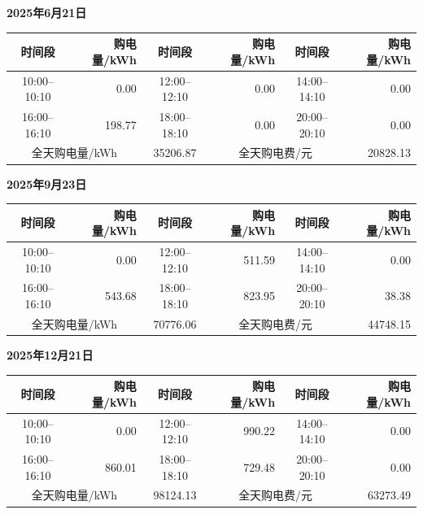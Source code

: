 \documentclass[UTF8,a4paper,12pt]{ctexart}
\begin{document}
\par\smallskip
\noindent\begin{minipage}{\textwidth}
  \centering\small
  \setlength{\tabcolsep}{4pt}
  \renewcommand{\arraystretch}{0.94}
  \textbf{2025年6月21日}\\[2pt]
  \begin{tabular}{|c|r|c|r|c|r|}
    \hline
    时间段 & 购电量/kWh & 时间段 & 购电量/kWh & 时间段 & 购电量/kWh\\
    \hline
    10:00--10:10 & 0.00 & 12:00--12:10 & 0.00 & 14:00--14:10 & 0.00\\
    \hline
    16:00--16:10 & 198.77 & 18:00--18:10 & 0.00 & 20:00--20:10 & 0.00\\
    \hline
    \multicolumn{2}{|c|}{全天购电量/kWh} & 35206.87
      & \multicolumn{2}{c|}{全天购电费/元} & 20828.13\\
    \hline
  \end{tabular}

\end{minipage}

\par\smallskip
\noindent\begin{minipage}{\textwidth}
  \centering\small
  \setlength{\tabcolsep}{4pt}
  \renewcommand{\arraystretch}{0.94}
  \textbf{2025年9月23日}\\[2pt]
  \begin{tabular}{|c|r|c|r|c|r|}
    \hline
    时间段 & 购电量/kWh & 时间段 & 购电量/kWh & 时间段 & 购电量/kWh\\
    \hline
    10:00--10:10 & 0.00 & 12:00--12:10 & 511.59 & 14:00--14:10 & 0.00\\
    \hline
    16:00--16:10 & 543.68 & 18:00--18:10 & 823.95 & 20:00--20:10 & 38.38\\
    \hline
    \multicolumn{2}{|c|}{全天购电量/kWh} & 70776.06
      & \multicolumn{2}{c|}{全天购电费/元} & 44748.15\\
    \hline
  \end{tabular}

\end{minipage}

\par\smallskip
\noindent\begin{minipage}{\textwidth}
  \centering\small
  \setlength{\tabcolsep}{4pt}
  \renewcommand{\arraystretch}{0.94}
  \textbf{2025年12月21日}\\[2pt]
  \begin{tabular}{|c|r|c|r|c|r|}
    \hline
    时间段 & 购电量/kWh & 时间段 & 购电量/kWh & 时间段 & 购电量/kWh\\
    \hline
    10:00--10:10 & 0.00 & 12:00--12:10 & 990.22 & 14:00--14:10 & 0.00\\
    \hline
    16:00--16:10 & 860.01 & 18:00--18:10 & 729.48 & 20:00--20:10 & 0.00\\
    \hline
    \multicolumn{2}{|c|}{全天购电量/kWh} & 98124.13
      & \multicolumn{2}{c|}{全天购电费/元} & 63273.49\\
    \hline
  \end{tabular}
\end{minipage}
\end{document}
